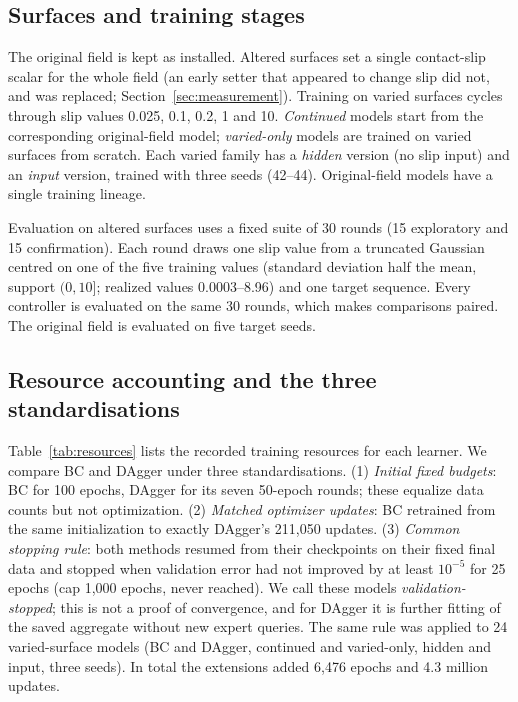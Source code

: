 \documentclass[conference]{IEEEtran}
\begin{document}
\subsection{Surfaces and training stages}
The original field is kept as installed. Altered surfaces set a single contact-slip scalar for the whole field (an early setter that appeared to change slip did not, and was replaced; Section~\ref{sec:measurement}). Training on varied surfaces cycles through slip values 0.025, 0.1, 0.2, 1 and 10. \emph{Continued} models start from the corresponding original-field model; \emph{varied-only} models are trained on varied surfaces from scratch. Each varied family has a \emph{hidden} version (no slip input) and an \emph{input} version, trained with three seeds (42--44). Original-field models have a single training lineage.

Evaluation on altered surfaces uses a fixed suite of 30 rounds (15 exploratory and 15 confirmation). Each round draws one slip value from a truncated Gaussian centred on one of the five training values (standard deviation half the mean, support $(0,10]$; realized values 0.0003--8.96) and one target sequence. Every controller is evaluated on the same 30 rounds, which makes comparisons paired. The original field is evaluated on five target seeds.

\subsection{Resource accounting and the three standardisations}
\label{sec:resources}
Table~\ref{tab:resources} lists the recorded training resources for each learner. We compare BC and DAgger under three standardisations. (1) \emph{Initial fixed budgets}: BC for 100 epochs, DAgger for its seven 50-epoch rounds; these equalize data counts but not optimization. (2) \emph{Matched optimizer updates}: BC retrained from the same initialization to exactly DAgger's 211,050 updates. (3) \emph{Common stopping rule}: both methods resumed from their checkpoints on their fixed final data and stopped when validation error had not improved by at least $10^{-5}$ for 25 epochs (cap 1,000 epochs, never reached). We call these models \emph{validation-stopped}; this is not a proof of convergence, and for DAgger it is further fitting of the saved aggregate without new expert queries. The same rule was applied to 24 varied-surface models (BC and DAgger, continued and varied-only, hidden and input, three seeds). In total the extensions added 6,476 epochs and 4.3 million updates.
\end{document}
